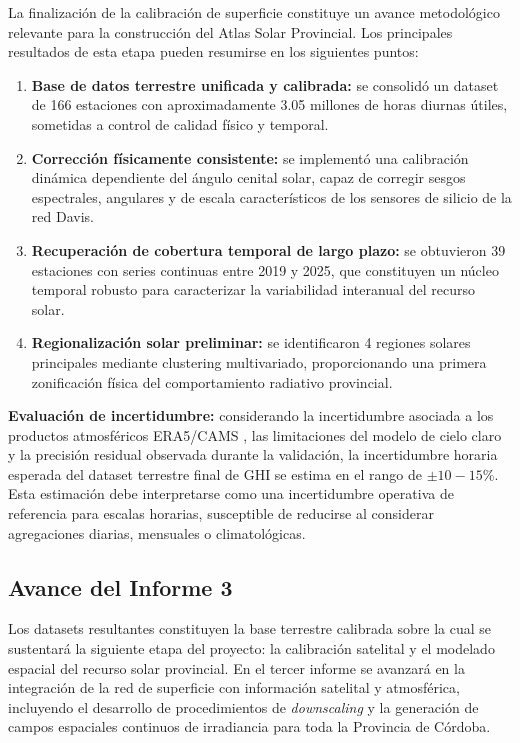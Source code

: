 \documentclass[../main.tex]{subfiles}
\begin{document}
La finalización de la calibración de superficie constituye un avance metodológico relevante para la construcción del Atlas Solar Provincial. Los principales resultados de esta etapa pueden resumirse en los siguientes puntos:

\begin{enumerate}
    \item \textbf{Base de datos terrestre unificada y calibrada:} se consolidó un dataset de 166 estaciones con aproximadamente 3.05 millones de horas diurnas útiles, sometidas a control de calidad físico y temporal.

    \item \textbf{Corrección físicamente consistente:} se implementó una calibración dinámica dependiente del ángulo cenital solar, capaz de corregir sesgos espectrales, angulares y de escala característicos de los sensores de silicio de la red Davis.

    \item \textbf{Recuperación de cobertura temporal de largo plazo:} se obtuvieron 39 estaciones con series continuas entre 2019 y 2025, que constituyen un núcleo temporal robusto para caracterizar la variabilidad interanual del recurso solar.

    \item \textbf{Regionalización solar preliminar:} se identificaron 4 regiones solares principales mediante clustering multivariado, proporcionando una primera zonificación física del comportamiento radiativo provincial.
\end{enumerate}

\textbf{Evaluación de incertidumbre:} considerando la incertidumbre asociada a los productos atmosféricos ERA5/CAMS \cite{hersbach_2020_era5,inness_2019_cams}, las limitaciones del modelo de cielo claro \cite{gueymard_2012_clearsky} y la precisión residual observada durante la validación, la incertidumbre horaria esperada del dataset terrestre final de GHI se estima en el rango de $\pm 10-15\%$. Esta estimación debe interpretarse como una incertidumbre operativa de referencia para escalas horarias, susceptible de reducirse al considerar agregaciones diarias, mensuales o climatológicas.

\subsection{Avance del Informe 3}

Los datasets resultantes constituyen la base terrestre calibrada sobre la cual se sustentará la siguiente etapa del proyecto: la calibración satelital y el modelado espacial del recurso solar provincial. En el tercer informe se avanzará en la integración de la red de superficie con información satelital y atmosférica, incluyendo el desarrollo de procedimientos de \textit{downscaling} y la generación de campos espaciales continuos de irradiancia para toda la Provincia de Córdoba.
\end{document}
